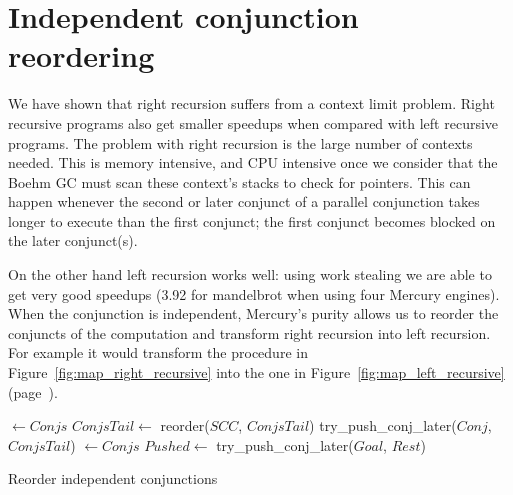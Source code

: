 
\section{Independent conjunction reordering}
\label{sec:rts_reorder}

We have shown that right recursion suffers from a context limit problem.
Right recursive programs also get smaller speedups when compared with left
recursive programs.
The problem with right recursion is the large number of contexts needed.
This is memory intensive, and CPU intensive once we consider that
the Boehm GC must scan these context's stacks to check for pointers.
This can happen whenever the second or later
conjunct of a parallel conjunction
takes longer to execute than the first conjunct;
the first conjunct becomes blocked on the later conjunct(s).

On the other hand left recursion works well:
using work stealing we are able to get very good speedups (3.92 for
mandelbrot when using four Mercury engines).
When the conjunction is independent,
Mercury's purity allows us to reorder the conjuncts of the computation and
transform right recursion into left recursion.
For example it would transform the procedure in
Figure~\ref{fig:map_right_recursive} into the one in
Figure~\ref{fig:map_left_recursive} (page~\pageref{fig:map_right_recursive}).

\begin{algorithm}
\begin{algorithmic}[1]
        \State \Return \nil
    \Else
        \State {} $\gets Conjs$
        \State $ConjsTail \gets$ reorder($SCC$, $ConjsTail$)
            \State \Return {}
        \Else
            \State \Return try\_push\_conj\_later($Conj$, $ConjsTail$)
        \EndIf
    \EndIf
\EndProcedure
{}
        \State \Return {}
    \Else
        \State {} $\gets Conjs$
            \State $Pushed \gets$ try\_push\_conj\_later($Goal$, $Rest$)
            \State \Return {}
        \Else
            \State \Return {}
        \EndIf
    \EndIf
\EndProcedure
\end{algorithmic}
\caption{Reorder independent conjunctions}
\label{alg:reorder_conjunction}
\end{algorithm}

